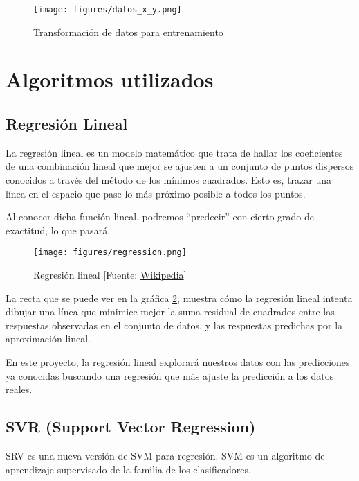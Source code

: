 \begin{figure}[htb]
	\begin{center}
		\texttt{[image: figures/datos\_x\_y.png]}
		\caption{Transformación de datos para entrenamiento \label{x_y}}
	\end{center}
\end{figure}

\section{Algoritmos utilizados}
\label{makereference5.3}
	\subsection{Regresión Lineal}
	\label{makereference5.3.1}

	La regresión lineal es un modelo matemático que trata de hallar los coeficientes de una combinación lineal que mejor se ajusten a un conjunto de puntos dispersos conocidos a través del método de los mínimos cuadrados. Esto es, trazar una línea en el espacio que pase lo más próximo posible a todos los puntos.

	Al conocer dicha función lineal, podremos ``predecir'' con cierto grado de exactitud, lo que pasará.

	\begin{figure}[htb]
		\begin{center}
			\texttt{[image: figures/regression.png]}
			\caption{Regresión lineal [Fuente: \href{www.wikipedia.org}{Wikipedia}] \label{regression}}
		\end{center}
	\end{figure}
	
	La recta que se puede ver en la gráfica \ref{regression}, muestra cómo la regresión lineal intenta dibujar una línea que minimice mejor la suma residual de cuadrados entre las respuestas observadas en el conjunto de datos, y las respuestas predichas por la aproximación lineal.

	En este proyecto, la regresión lineal explorará nuestros datos con las predicciones ya conocidas buscando una regresión que más ajuste la predicción a los datos reales.

	\subsection{SVR (Support Vector Regression)}
	\label{makereference5.3.2}

	SRV es una nueva versión de SVM para regresión. SVM es un algoritmo de aprendizaje supervisado de la familia de los clasificadores.

